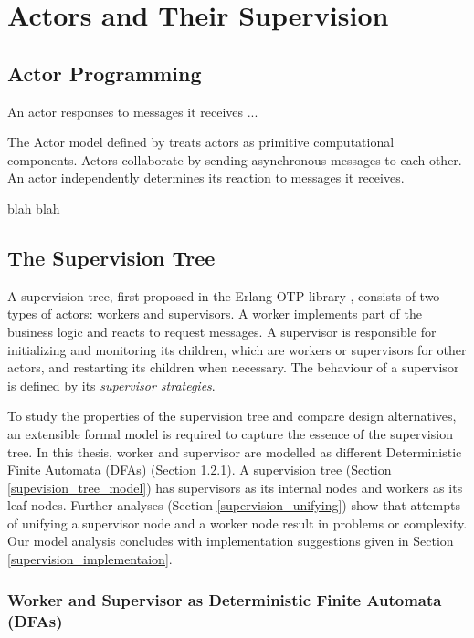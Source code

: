 \chapter{Actors and Their Supervision}
\label{supervision_model}

\section{Actor Programming}

An actor responses to messages it receives ...


The Actor model defined by \citet{Hewitt:1973} treats actors as
primitive computational components.  Actors collaborate by sending asynchronous
messages to each other.  An actor independently determines its reaction to
messages it receives.

blah blah

\section{The Supervision Tree}
A supervision tree, first proposed in the Erlang OTP library 
\citep{OTP}, consists of two types of actors: workers and supervisors. A worker 
implements part of the business logic and reacts to request messages.  A 
supervisor is responsible for initializing and monitoring its children, which 
are workers or supervisors for other actors, and restarting its children when 
necessary.  The behaviour of a supervisor is defined by its {\it supervisor 
strategies}.

To study the properties of the supervision tree and compare design 
alternatives, an extensible formal model is required to capture the essence of 
the supervision tree. In this thesis, worker and supervisor are modelled as 
different Deterministic Finite Automata (DFAs) (Section 
\ref{supevision_node_model}).  A supervision tree (Section 
\ref{supevision_tree_model}) has supervisors as its internal nodes and workers 
as its leaf nodes.  Further analyses (Section \ref{supervision_unifying}) show 
that attempts of unifying a supervisor node and a worker node result in 
problems or complexity.  Our model analysis concludes with implementation 
suggestions given in Section \ref{supervision_implementaion}.

\subsection{Worker and Supervisor as Deterministic Finite Automata (DFAs)} 
\label{supevision_node_model}

